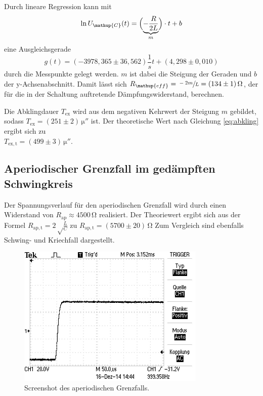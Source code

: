 Durch lineare Regression kann mit
\begin{equation}
\ln{U_\mathup{C}}(t)=\Bigl(\underbrace{-\frac{R}{2L}}_m\Bigr)\cdot t +b
\end{equation}
eine Ausgleichsgerade 
\begin{equation}
g(t)=(-3978,365\pm 36,562)\frac{1}{s} t + (4,298\pm0,010)
\end{equation}
durch die Messpunkte gelegt werden. 
$m$ ist dabei die Steigung der Geraden und $b$ der y-Achsenabschnitt.
Damit lässt sich $R_\mathup{eff}=\sfrac{-2m}{L}=(134\pm1)\,\si\ohm$, der für die in der Schaltung auftretende Dämpfungswiderstand, berechnen. 

Die Abklingdauer $T_\mathup{ex}$ wird aus dem negativen Kehrwert der Steigung $m$ gebildet, sodass $T_\mathup{ex}=(251\pm2)\,\si{\micro{\second}}$ ist.
Der theoretische Wert nach Gleichung \eqref{eq:abkling} ergibt sich zu \\$T_\mathup{ex,t}=(499\pm3)\,\si{\micro{\second}}$.


\subsection{Aperiodischer Grenzfall im gedämpften Schwingkreis}
Der Spannungsverlauf für den aperiodischen Grenzfall wird durch einen Widerstand von $R_\mathup{ap}\approx4500\,\si\ohm$ realisiert. 
Der Theoriewert ergibt sich aus der Formel $R_\mathup{ap,t}=2\sqrt\frac{L}{C}$ zu $R_\mathup{ap,t}=(5700\pm20)\,\si\ohm$
 Zum Vergleich sind ebenfalls Schwing- und Kriechfall dargestellt.
\newpage
\begin{figure}[h]
		\centering
		\includegraphics[width=0.8\textwidth]{Bilder/Aperiodischer.JPG}
		\caption{Screenshot des aperiodischen Grenzfalls.}
\end{figure}

